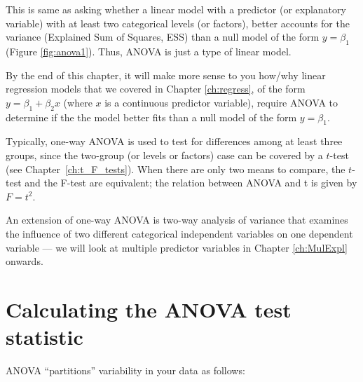 This is same as asking whether a linear model with a predictor (or 
explanatory variable) with at least two categorical levels (or 
factors), better accounts for the variance (Explained Sum of Squares, 
ESS) than a null model of the form $y  = \beta_1$ (Figure 
\ref{fig:anova1}). Thus, ANOVA is just a type of linear model. 

By the end of this chapter, it will make more sense to you how/why 
linear regression models that we covered in Chapter \ref{ch:regress}, 
of the form $y = \beta_1  + \beta_2 x$ (where $x$ is a continuous 
predictor variable),  require ANOVA to determine if the the model 
better fits than a null model of the form $y  = \beta_1$.

Typically, one-way ANOVA is used to test for differences among at least 
three groups, since the two-group (or levels or factors) case can be 
covered by a $t$-test (see Chapter~\ref{ch:t_F_tests}). When there 
are only two means to compare, the $t$-test and the F-test are 
equivalent; the relation between ANOVA and t is given by $F = t^2$. 

An extension of one-way ANOVA is two-way analysis of variance that 
examines the influence of two different categorical independent 
variables on one dependent variable --- we will look at multiple 
predictor variables in Chapter \ref{ch:MulExpl} onwards.

\section{Calculating the ANOVA test statistic}

ANOVA ``partitions'' variability in your data as follows: 

